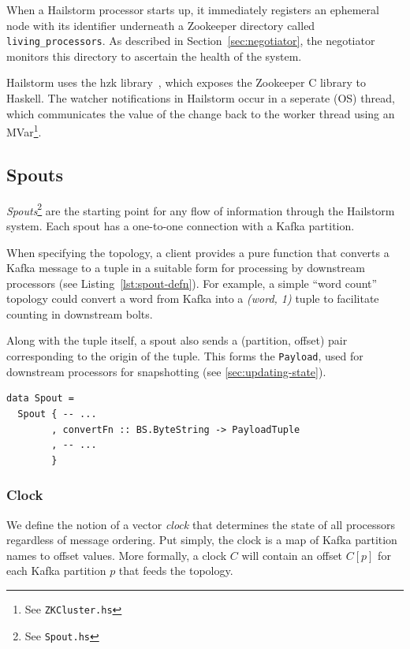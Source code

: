 \documentclass[10pt,nocopyrightspace]{sigplanconf}
\begin{document}
When a Hailstorm processor starts up, it immediately registers an ephemeral node
with its identifier underneath a Zookeeper directory called
\lstinline{living_processors}. As described in Section~\ref{sec:negotiator}, the
negotiator monitors this directory to ascertain the health of the system.

Hailstorm uses the hzk library~\cite{hzk}, which exposes the
Zookeeper C library to Haskell. The watcher notifications in Hailstorm occur in
a seperate (OS) thread, which communicates the value of the change
back to the worker thread using an MVar\footnote{See \texttt{ZKCluster.hs}}.

\subsection{Spouts}

\textit{Spouts}\footnote{See \texttt{Spout.hs}} are the starting point for any
flow of information through the Hailstorm system. Each spout has a one-to-one
connection with a Kafka partition.

When specifying the topology, a client provides a pure function that converts a
Kafka message to a tuple in a suitable form for processing by downstream
processors (see Listing~\ref{lst:spout-defn}).  For example, a simple ``word
count'' topology could convert a word from Kafka into a \textit{(word, 1)}
tuple to facilitate counting in downstream bolts.

Along with the tuple itself, a spout also sends a (partition, offset) pair
corresponding to the origin of the tuple. This forms the \texttt{Payload}, 
used for downstream processors for snapshotting (see \ref{sec:updating-state}).

\begin{lstlisting}[caption=Client interface for a
spout,label=lst:spout-defn,float]
data Spout =
  Spout { -- ...
        , convertFn :: BS.ByteString -> PayloadTuple
        , -- ...
        }
\end{lstlisting}

\subsubsection{Clock}
\label{sec:clock}

We define the notion of a vector \textit{clock} that determines the 
state of all processors regardless of message ordering.  Put
simply, the clock is a map of Kafka partition names to offset values.
More formally, a clock $C$ will contain an offset
$C[p]$ for each Kafka partition $p$ that feeds the topology.
\end{document}
